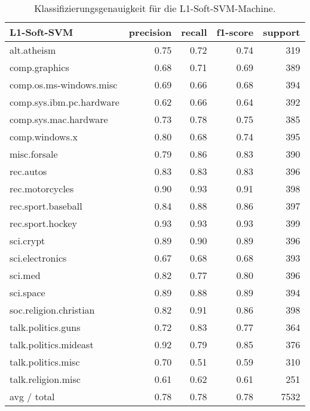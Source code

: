 \begin{table}[h!]
\centering
\begin{tabular}{|l | r | r | r | r|}
\hline
L1-Soft-SVM                    & precision  &  recall &  f1-score &   support \\
\hline
             alt.atheism       & 0.75      & 0.72      & 0.74      & 319  \\
           comp.graphics       & 0.68      & 0.71      & 0.69      & 389 \\
 comp.os.ms-windows.misc       & 0.69      & 0.66      & 0.68      & 394 \\
comp.sys.ibm.pc.hardware       & 0.62      & 0.66      & 0.64      & 392 \\
   comp.sys.mac.hardware       & 0.73      & 0.78      & 0.75      & 385 \\
          comp.windows.x       & 0.80      & 0.68      & 0.74      & 395 \\
            misc.forsale       & 0.79      & 0.86      & 0.83      & 390 \\
               rec.autos       & 0.83      & 0.83      & 0.83      & 396 \\
         rec.motorcycles       & 0.90      & 0.93      & 0.91      & 398 \\
      rec.sport.baseball       & 0.84      & 0.88      & 0.86      & 397 \\
        rec.sport.hockey       & 0.93      & 0.93      & 0.93      & 399 \\
               sci.crypt       & 0.89      & 0.90      & 0.89      & 396 \\
         sci.electronics       & 0.67      & 0.68      & 0.68      & 393 \\
                 sci.med       & 0.82      & 0.77      & 0.80      & 396 \\
               sci.space       & 0.89      & 0.88      & 0.89      & 394 \\
  soc.religion.christian       & 0.82      & 0.91      & 0.86      & 398 \\
      talk.politics.guns       & 0.72      & 0.83      & 0.77      & 364 \\
   talk.politics.mideast       & 0.92      & 0.79      & 0.85      & 376 \\
      talk.politics.misc       & 0.70      & 0.51      & 0.59      & 310 \\
      talk.religion.misc       & 0.61      & 0.62      & 0.61      & 251 \\
\hline
             avg / total      & 0.78      &  0.78     & 0.78      & 7532\\
\hline			 
\end{tabular}
\caption{Klassifizierungsgenauigkeit für die L1-Soft-SVM-Machine.}
\label{tab:L1SoftSVM}
\end{table}

